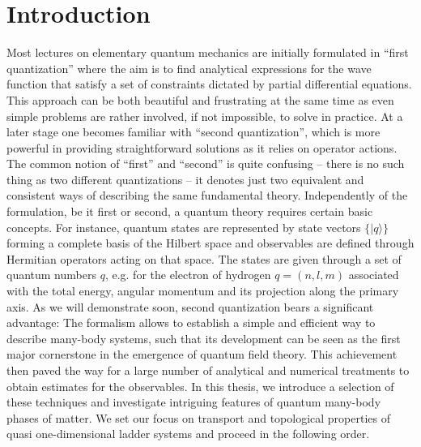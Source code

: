 %
\chapter*{Introduction}
%
Most lectures on elementary quantum mechanics are initially formulated in ``first quan\-ti\-zation'' where the aim is to find analytical expressions for the wave function that satisfy a set of constraints dictated by partial differential equations.
This approach can be both beautiful and frustrating at the same time as even simple problems are rather involved, if not impossible, to solve in practice.
At a later stage one becomes familiar with ``second quantization'', which is more powerful in providing straightforward solutions as it relies on operator actions.
The common notion of ``first'' and ``second'' is quite confusing -- there is no such thing as two different quantizations -- it denotes just two equivalent and consistent ways of describing the same fundamental theory.
Independently of the formulation, be it first or second, a quantum theory requires certain basic concepts.
For instance, quantum states are represented by state vectors $\{|q\rangle\}$ forming a complete basis of the Hilbert space and observables are defined through Hermitian operators acting on that space.
The states are given through a set of quantum numbers $q$, e.g. for the electron of hydrogen $q=(n,l,m)$ associated with the total energy, angular momentum and its projection along the primary axis.
As we will demonstrate soon, second quantization bears a significant advantage: The formalism allows to establish a simple and efficient way to describe many-body systems, such that its development can be seen as the first major cornerstone in the emergence of quantum field theory.
This achievement then paved the way for a large number of analytical and numerical treatments to obtain estimates for the observables.
In this thesis, we introduce a selection of these techniques and investigate intriguing features of quantum many-body phases of matter.
We set our focus on transport and topological properties of quasi one-dimensional ladder systems and proceed in the following order.

